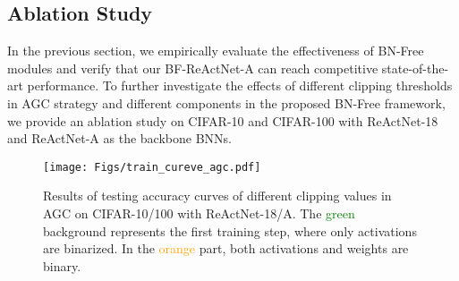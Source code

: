 \documentclass[final]{cvpr}
\begin{document}
\begin{table}[t]
\caption{\small Ablation Study of clipping threshold values in AGC on CIFAR-10/100 with ReActNet-18 and ReActNet-A.}
\vspace{1mm}
\label{tab:ablation_agc_cifar100}
\centering
{}
\end{table}

\subsection{Ablation Study}
In the previous section, we empirically evaluate the effectiveness of BN-Free modules and verify that our BF-ReActNet-A can reach competitive state-of-the-art performance.
To further investigate the effects of different clipping thresholds in AGC strategy and different components in the proposed BN-Free framework, we provide an ablation study on CIFAR-10 and CIFAR-100 with ReActNet-18 and ReActNet-A as the backbone BNNs.

\begin{figure*}[t]
    \centering
    \texttt{[image: Figs/train\_cureve\_agc.pdf]}
    \caption{Results of testing accuracy curves of different clipping values in AGC on CIFAR-10/100 with ReActNet-18/A. The \textcolor{green}{green} background represents the first training step, where only activations are binarized. In the \textcolor{orange}{orange} part, both activations and weights are binary. }
    \label{fig:curve_agc}
\end{figure*}
\end{document}
